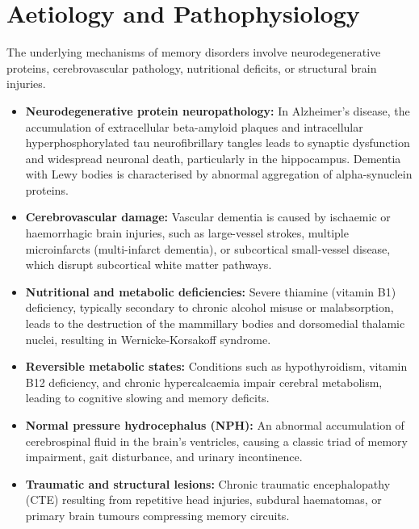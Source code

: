 \section*{Aetiology and Pathophysiology}
The underlying mechanisms of memory disorders involve neurodegenerative proteins, cerebrovascular pathology, nutritional deficits, or structural brain injuries.
\begin{itemize}
    \item \textbf{Neurodegenerative protein neuropathology:} In Alzheimer's disease, the accumulation of extracellular beta-amyloid plaques and intracellular hyperphosphorylated tau neurofibrillary tangles leads to synaptic dysfunction and widespread neuronal death, particularly in the hippocampus. Dementia with Lewy bodies is characterised by abnormal aggregation of alpha-synuclein proteins.
    \item \textbf{Cerebrovascular damage:} Vascular dementia is caused by ischaemic or haemorrhagic brain injuries, such as large-vessel strokes, multiple microinfarcts (multi-infarct dementia), or subcortical small-vessel disease, which disrupt subcortical white matter pathways.
    \item \textbf{Nutritional and metabolic deficiencies:} Severe thiamine (vitamin B1) deficiency, typically secondary to chronic alcohol misuse or malabsorption, leads to the destruction of the mammillary bodies and dorsomedial thalamic nuclei, resulting in Wernicke-Korsakoff syndrome.
    \item \textbf{Reversible metabolic states:} Conditions such as hypothyroidism, vitamin B12 deficiency, and chronic hypercalcaemia impair cerebral metabolism, leading to cognitive slowing and memory deficits.
    \item \textbf{Normal pressure hydrocephalus (NPH):} An abnormal accumulation of cerebrospinal fluid in the brain's ventricles, causing a classic triad of memory impairment, gait disturbance, and urinary incontinence.
    \item \textbf{Traumatic and structural lesions:} Chronic traumatic encephalopathy (CTE) resulting from repetitive head injuries, subdural haematomas, or primary brain tumours compressing memory circuits.
\end{itemize}

